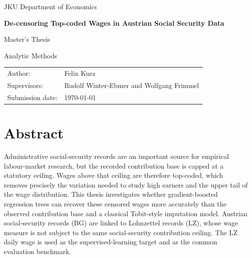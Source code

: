 \documentclass[12pt,a4paper,oneside,titlepage]{book}
\newcommand{\thesistitle}{De-censoring Top-coded Wages in Austrian Social Security Data}
\newcommand{\thesisauthor}{Felix Kurz}
\newcommand{\thesistype}{Master's Thesis}
\newcommand{\degreeprogramme}{Analytic Methods}
\newcommand{\university}{JKU Department of Economics}
\newcommand{\supervisors}{Rudolf Winter-Ebmer and Wolfgang Frimmel}
\newcommand{\submissiondate}{\today}
\begin{document}
\frontmatter

\begin{titlepage}
  \centering
  \vspace*{18mm}

  {\Large \university\par}
  \vspace{24mm}

  {\Huge\bfseries \thesistitle\par}
  \vspace{16mm}

  {\Large \thesistype\par}
  \vspace{6mm}

  {\large \degreeprogramme\par}

  \vfill

  \begin{tabular}{@{}ll@{}}
    Author: & \thesisauthor \\
    Supervisors: & \supervisors \\
    Submission date: & \submissiondate
  \end{tabular}

  \vspace*{12mm}
\end{titlepage}

\chapter*{Abstract}
Administrative social-security records are an important source for empirical labour-market research, but the recorded contribution base is capped at a statutory ceiling. Wages above that ceiling are therefore top-coded, which removes precisely the variation needed to study high earners and the upper tail of the wage distribution. This thesis investigates whether gradient-boosted regression trees can recover these censored wages more accurately than the observed contribution base and a classical Tobit-style imputation model. Austrian social-security records (BG) are linked to Lohnzettel records (LZ), whose wage measure is not subject to the same social-security contribution ceiling. The LZ daily wage is used as the supervised-learning target and as the common evaluation benchmark.
\end{document}
